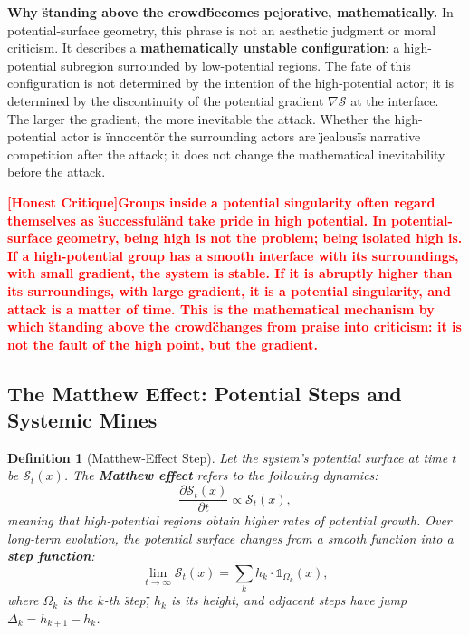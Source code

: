 \documentclass[12pt,a4paper]{article}
\newtheorem{definition}[theorem]{Definition}
\theoremstyle{remark}
\newcommand{\honestcrit}[1]{%
    \textcolor{red}{\textbf{[Honest Critique]#1}}%
}
\begin{document}
\textbf{Why \"standing above the crowd\" becomes pejorative, mathematically.} In potential-surface geometry, this phrase is not an aesthetic judgment or moral criticism. It describes a \textbf{mathematically unstable configuration}: a high-potential subregion surrounded by low-potential regions. The fate of this configuration is not determined by the intention of the high-potential actor; it is determined by the discontinuity of the potential gradient $\nabla \mathcal{S}$ at the interface. The larger the gradient, the more inevitable the attack. Whether the high-potential actor is \"innocent\" or the surrounding actors are \"jealous\" is narrative competition after the attack; it does not change the mathematical inevitability before the attack.

\honestcrit{Groups inside a potential singularity often regard themselves as \"successful\" and take pride in high potential. In potential-surface geometry, being high is not the problem; being \textbf{isolated high} is. If a high-potential group has a smooth interface with its surroundings, with small gradient, the system is stable. If it is abruptly higher than its surroundings, with large gradient, it is a potential singularity, and attack is a matter of time. This is the mathematical mechanism by which \"standing above the crowd\" changes from praise into criticism: it is not the fault of the high point, but the gradient.}

\subsection{The Matthew Effect: Potential Steps and Systemic Mines}

\begin{definition}[Matthew-Effect Step]\label{def:matthew}
Let the system's potential surface at time $t$ be $\mathcal{S}_t(x)$. The \textbf{Matthew effect} refers to the following dynamics:
\begin{equation}
    \frac{\partial \mathcal{S}_t(x)}{\partial t} \propto \mathcal{S}_t(x),
\end{equation}
meaning that high-potential regions obtain higher rates of potential growth. Over long-term evolution, the potential surface changes from a smooth function into a \textbf{step function}:
\begin{equation}
    \lim_{t \to \infty} \mathcal{S}_t(x) = \sum_{k} h_k \cdot \mathbb{1}_{\Omega_k}(x),
\end{equation}
where $\Omega_k$ is the $k$-th \"step\", $h_k$ is its height, and adjacent steps have jump $\Delta_k = h_{k+1} - h_k$.
\end{definition}
\end{document}
